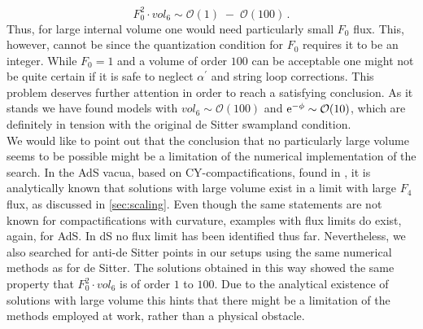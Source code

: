 \documentclass[a4paper,12pt,twoside,openright]{report}
\newcommand{\be}{\begin{equation}}
\newcommand{\ee}{\end{equation}}
\def\rme{{\rm e}}
\begin{document}
\be 
F_0^2 \cdot vol_6 \sim \mathcal{O}(1) \; - \; \mathcal{O}(100)\,.
\ee
Thus, for large internal volume one would need particularly small $F_0$ flux. This, however, cannot be since the quantization condition for $F_0$ requires it to be an integer. While $F_0=1$ and a volume of order $100$ can be acceptable one might not be quite certain if it is safe to neglect $\alpha^ \prime$ and string loop corrections. This problem deserves further attention in order to reach a satisfying conclusion. As it stands we have found models with $vol_6 \sim \mathcal{O}(100)$ and $\rme^ {-\phi} \sim \mathcal{O}(10)$, which are definitely in tension with the original de Sitter swampland condition.\\
We would like to point out that the conclusion that no particularly large volume seems to be possible might be a limitation of the numerical implementation of the search. In the AdS vacua, based on CY-compactifications, found in \cite{DeWolfe:2005uu}, it is analytically known that solutions with large volume exist in a limit with large $F_4$ flux, as discussed in \ref{sec:scaling}. Even though the same statements are not known for compactifications with curvature, examples with flux limits do exist, again, for AdS. In dS no flux limit has been identified thus far. Nevertheless, we also searched for anti-de Sitter points in our setups using the same numerical methods as for de Sitter. The solutions obtained in this way showed the same property that $F_0^ 2 \cdot vol_6$ is of order $1$ to $100$. Due to the analytical existence of solutions with large volume this hints that there might be a limitation of the methods employed at work, rather than a physical obstacle.
\end{document}
